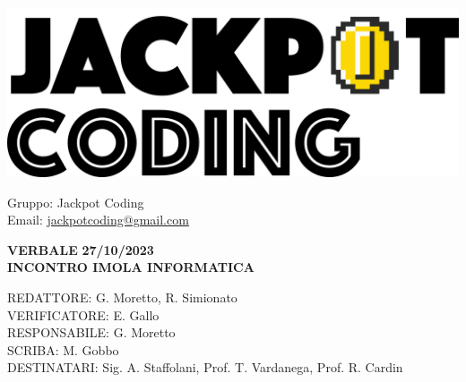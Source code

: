 \documentclass[5pt]{article}
\begin{document}
\begin{minipage}[t]{0.50\textwidth}
    \begin{flushleft}
        \hspace{10pt}
        \includegraphics[scale=0.65]{assets/jackpot-logo.png} 
    \end{flushleft}
\end{minipage}
\hspace{-60pt} %
\begin{flushright}
    \begin{minipage}[t]{0.50\textwidth}
        \begin{flushright}
            Gruppo: {\Large Jackpot Coding}\\
            Email: \href{mailto:jackpotcoding@gmail.com}{jackpotcoding@gmail.com}
        \end{flushright}
    \end{minipage}
\end{flushright}

\vspace{24pt}

\begin{center}
    \textbf{\large VERBALE }
    \textbf{\large 27/10/2023} \\
    \textbf{\LARGE INCONTRO IMOLA INFORMATICA}
\end{center}

\vspace{13pt}

\begin{flushleft}
    \begin{spacing}{1.5}
        REDATTORE:  G. Moretto, R. Simionato\\%
        VERIFICATORE:   E. Gallo\\%
        RESPONSABILE:   G. Moretto\\%
        \vspace{7pt}
        SCRIBA: M. Gobbo\\%
        \vspace{7pt}
        DESTINATARI:  Sig. A. Staffolani, Prof. T. Vardanega, Prof. R. Cardin\\%
    \end{spacing}
\end{flushleft}
\end{document}
